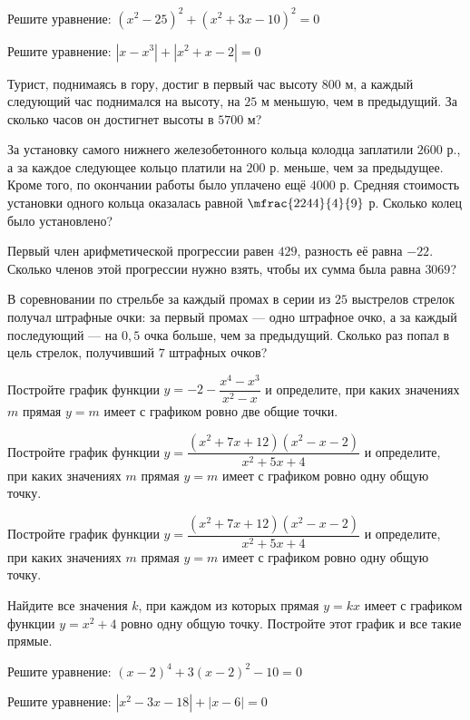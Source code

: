 \begin{class}[number=3]
	\begin{listofex}
		\item Решите уравнение: \quad \( (x^2-25)^2+(x^2+3x-10)^2=0 \)
		\item Решите уравнение: \quad \( |x-x^3|+|x^2+x-2|=0 \)
		\item Турист, поднимаясь в гору, достиг в первый час высоту \( 800 \) м, а каждый следующий час поднимался на высоту, на \( 25 \) м меньшую, чем в предыдущий. За сколько часов он достигнет высоты в \( 5700 \) м?
		\item За установку самого нижнего железобетонного кольца колодца заплатили \( 2600 \) р., а за каждое следующее кольцо платили на \( 200 \) р. меньше, чем за предыдущее. Кроме того, по окончании работы было уплачено ещё \( 4000 \) р. Средняя стоимость установки одного кольца оказалась равной \( \mfrac{2244}{4}{9} \) р. Сколько колец было установлено?
		\item Первый член арифметической прогрессии равен \( 429 \), разность её равна \( -22 \). Сколько членов этой прогрессии нужно взять, чтобы их сумма была равна \( 3069 \)?
		\item В соревновании по стрельбе за каждый промах в серии из \( 25 \) выстрелов стрелок получал штрафные очки: за первый промах --- одно штрафное очко, а за каждый последующий --- на \( 0,5 \) очка больше, чем за предыдущий. Сколько раз попал в цель стрелок, получивший \( 7 \) штрафных очков?
		\item Постройте график функции \( y=-2-\dfrac{x^4-x^3}{x^2-x} \) и определите, при каких значениях \( m \) прямая \( y=m \) имеет с графиком ровно две общие точки.
		\item Постройте график функции \( y=\dfrac{(x^2+7x+12)(x^2-x-2)}{x^2+5x+4} \) и определите, при каких значениях \( m \) прямая \( y=m \) имеет с графиком ровно одну общую точку.
	\end{listofex}
\end{class}

\begin{class}[number=4]
	\begin{listofex}
		\item Постройте график функции \( y=\dfrac{(x^2+7x+12)(x^2-x-2)}{x^2+5x+4} \) и определите, при каких значениях \( m \) прямая \( y=m \) имеет с графиком ровно одну общую точку.
		\item Найдите все значения \( k \), при каждом из которых прямая \( y = kx \) имеет с графиком функции \( y = x^2+4 \) ровно одну общую точку. Постройте этот график и все такие прямые.
		\item Решите уравнение: \quad \( (x-2)^4+3(x-2)^2-10=0 \)
		\item Решите уравнение: \quad \( |x^2-3x-18|+|x-6|=0 \)
	\end{listofex}
\end{class}

